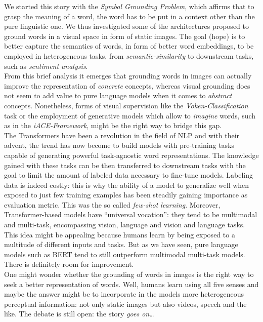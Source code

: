 \documentclass[
]{krantz}
\begin{document}
We started this story with the \emph{Symbol Grounding Problem}, which affirms that to grasp the meaning of a word, the word has to be put in a context other than the pure linguistic one. We thus investigated some of the architectures proposed to ground words in a visual space in form of static images. The goal (hope) is to better capture the semantics of words, in form of better word embeddings, to be employed in heterogeneous tasks, from \emph{semantic-similarity} to downstream tasks, such as \emph{sentiment analysis}.\\
From this brief analysis it emerges that grounding words in images can actually improve the representation of \emph{concrete} concepts, whereas visual grounding does not seem to add value to pure language models when it comes to \emph{abstract} concepts. Nonetheless, forms of visual supervision like the \emph{Voken-Classification} task or the employment of generative models which allow to \emph{imagine} words, such as in the \emph{iACE-Framework}, might be the right way to bridge this gap.\\
The Transformers have been a revolution in the field of NLP and with their advent, the trend has now become to build models with pre-training tasks capable of generating powerful task-agnostic word representations. The knowledge gained with these tasks can be then transferred to downstream tasks with the goal to limit the amount of labeled data necessary to fine-tune models. Labeling data is indeed costly: this is why the ability of a model to generalize well when exposed to just few training examples has been steadily gaining importance as evaluation metric. This was the so called \emph{few-shot learning}. Moreover, Transformer-based models have ``universal vocation'': they tend to be multimodal and multi-task, encompassing vision, language and vision and language tasks. This idea might be appealing because humans learn by being exposed to a multitude of different inputs and tasks. But as we have seen, pure language models such as BERT tend to still outperform multimodal multi-task models. There is definitely room for improvement.\\
One might wonder whether the grounding of words in images is the right way to seek a better representation of words. Well, humans learn using all five senses and maybe the answer might be to incorporate in the models more heterogeneous perceptual information: not only static images but also videos, speech and the like. The debate is still open: the story \emph{goes on}\ldots{}
\end{document}
